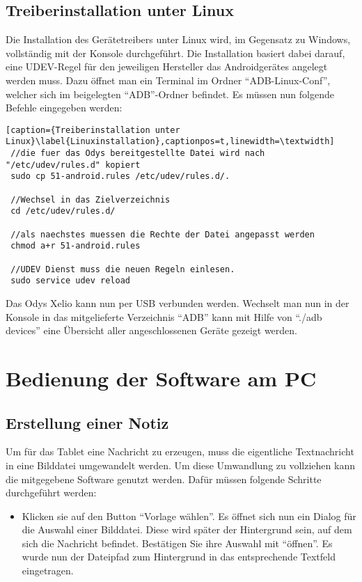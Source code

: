 \begin{flushleft}
\subsection{Treiberinstallation unter Linux}
Die Installation des Gerätetreibers unter Linux wird, im Gegensatz zu Windows, vollständig mit der Konsole durchgeführt. Die Installation basiert dabei darauf, eine UDEV-Regel für den jeweiligen Hersteller das Androidgerätes angelegt werden muss. Dazu öffnet man ein Terminal im Ordner ``ADB-Linux-Conf'', welcher sich im beigelegten ``ADB''-Ordner befindet. Es müssen nun folgende Befehle eingegeben werden:
 \begin{lstlisting}[caption={Treiberinstallation unter Linux}\label{Linuxinstallation},captionpos=t,linewidth=\textwidth] 
 //die fuer das Odys bereitgestellte Datei wird nach "/etc/udev/rules.d" kopiert
 sudo cp 51-android.rules /etc/udev/rules.d/.
 
 //Wechsel in das Zielverzeichnis
 cd /etc/udev/rules.d/
 
 //als naechstes muessen die Rechte der Datei angepasst werden
 chmod a+r 51-android.rules
 
 //UDEV Dienst muss die neuen Regeln einlesen. 
 sudo service udev reload
 \end{lstlisting}

 Das Odys Xelio kann nun per USB verbunden werden. Wechselt man nun in der Konsole in das mitgelieferte Verzeichnis ``ADB'' kann mit Hilfe von ``./adb devices'' eine Übersicht aller angeschlossenen Geräte gezeigt werden. 
 
\section{Bedienung der Software am PC}
\subsection{Erstellung einer Notiz}
Um für das Tablet eine Nachricht zu erzeugen, muss die eigentliche Textnachricht in eine Bilddatei umgewandelt werden. Um diese Umwandlung zu vollziehen kann die mitgegebene Software genutzt werden. Dafür müssen folgende Schritte durchgeführt werden:
\begin{itemize}
  \item Klicken sie auf den Button ``Vorlage wählen''.
    \subitem Es öffnet sich nun ein Dialog für die Auswahl einer Bilddatei. Diese wird später der Hintergrund sein, auf dem sich die 			 Nachricht befindet. Bestätigen Sie ihre Auswahl mit ``öffnen''.
    \subitem Es wurde nun der Dateipfad zum Hintergrund in das entsprechende Textfeld eingetragen. 
    

\end{itemize}
\end{flushleft}
